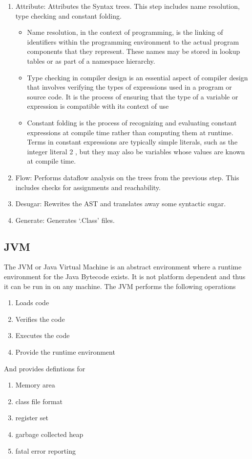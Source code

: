 \documentclass{article}
\begin{document}
\begin{enumerate}
    \item Attribute: Attributes the Syntax trees. This step includes name resolution, type checking and constant folding.
    \begin{itemize}
        \item Name resolution, in the context of programming, is the linking of identifiers within the programming environment to the actual program components that they represent. These names may be stored in lookup tables or as part of a namespace hierarchy.
        \item Type checking in compiler design is an essential aspect of compiler design that involves verifying the types of expressions used in a program or source code. It is the process of ensuring that the type of a variable or expression is compatible with its context of use
        \item Constant folding is the process of recognizing and evaluating constant expressions at compile time rather than computing them at runtime. Terms in constant expressions are typically simple literals, such as the integer literal 2 , but they may also be variables whose values are known at compile time.
    \end{itemize}
    \item Flow: Performs dataflow analysis on the trees from the previous step. This includes checks for assignments and reachability.
    \item Desugar: Rewrites the AST and translates away some syntactic sugar.
    \item Generate: Generates ‘.Class’ files.
\end{enumerate}

\subsection{JVM}

The JVM or Java Virtual Machine is an abstract environment where a runtime environment for the Java Bytecode exists.
It is not platform dependent and thus it can be run in on any machine. The JVM performs the following operations
\begin{enumerate}
    \item Loads code 
    \item Verifies the code
    \item Executes the code
    \item Provide the runtime environment
\end{enumerate}
And provides defintions for
\begin{enumerate}
    \item Memory area
    \item class file format
    \item register set
    \item garbage collected heap
    \item fatal error reporting 
\end{enumerate}
\end{document}

